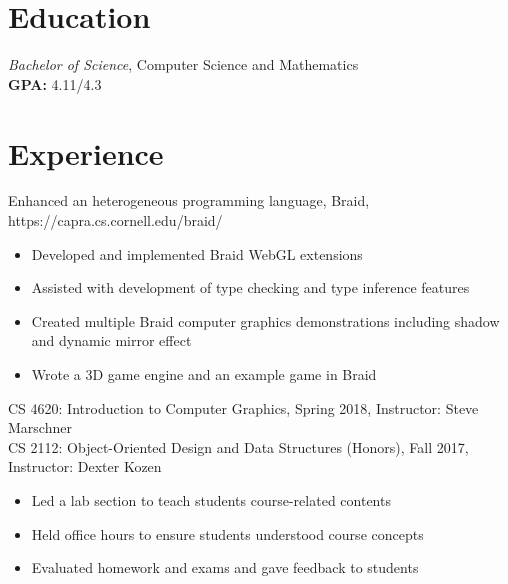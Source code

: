 \documentclass{resume}
\begin{document}



\section{Education}
\textit{Bachelor of Science}, Computer Science and Mathematics\\
\textbf{GPA: }4.11/4.3

\section{Experience}
Enhanced an heterogeneous programming language, Braid, https://capra.cs.cornell.edu/braid/
\begin{itemize}
  \item Developed and implemented Braid WebGL extensions
  \item Assisted with development of type checking and type inference features
  \item Created multiple Braid computer graphics demonstrations including shadow and dynamic mirror effect
  \item Wrote a 3D game engine and an example game in Braid
\end{itemize}

CS 4620: Introduction to Computer Graphics, Spring 2018, Instructor: Steve Marschner\\
CS 2112: Object-Oriented Design and Data Structures (Honors), Fall 2017, Instructor: Dexter Kozen
\begin{itemize}
  \item Led a lab section to teach students course-related contents
  \item Held office hours to ensure students understood course concepts
  \item Evaluated homework and exams and gave feedback to students
\end{itemize}
\end{document}
